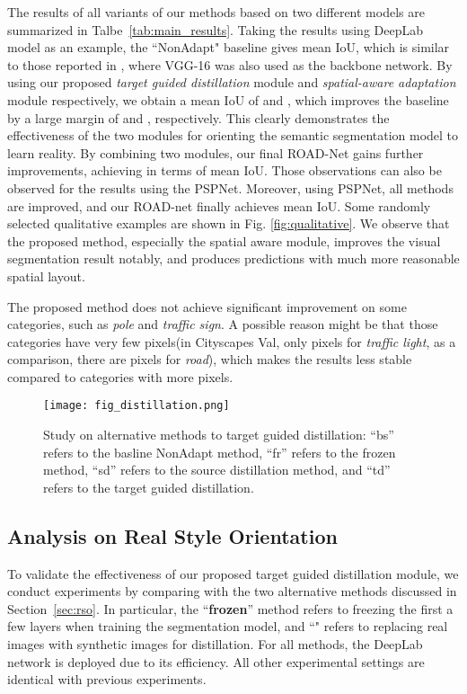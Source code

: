 \documentclass[10pt,twocolumn,letterpaper]{article}
\begin{document}
The results of all variants of our methods based on two different models are summarized in Talbe~\ref{tab:main_results}. Taking the results using DeepLab model as an example, the ``NonAdapt" baseline gives  mean IoU, which is similar to those reported in \cite{hoffman2016fcns,zhang2017curriculum}, where VGG-16 was also used as the backbone network. By using our proposed \textit{target guided distillation} module and \textit{spatial-aware adaptation} module respectively, we obtain a mean IoU of  and , which improves the baseline by a large margin of  and , respectively. This clearly demonstrates the effectiveness of the two modules for orienting the semantic segmentation model to learn reality.  By combining two modules, our final ROAD-Net gains further improvements, achieving  in terms of mean IoU. Those observations can also be observed for the results using the PSPNet. Moreover, using PSPNet, all methods are improved, and our ROAD-net finally achieves  mean IoU. Some randomly selected qualitative examples are shown in Fig. \ref{fig:qualitative}. We observe that the proposed method, especially the spatial aware module, improves the visual segmentation result notably, and produces predictions with much more reasonable spatial layout.

The proposed method does not achieve significant improvement on some categories, such as \textit{pole} and \textit{traffic sign}. A possible reason might be that those categories have very few pixels(\eg in Cityscapes Val, only  pixels for \textit{traffic light}, as a comparison, there are  pixels for \textit{road}), which makes the results less stable compared to categories with more pixels. 

\begin{figure}
\centering
\texttt{[image: fig\_distillation.png]}
\caption{Study on alternative methods to target guided distillation: ``bs'' refers to the basline NonAdapt method, ``fr'' refers to the frozen method, ``sd'' refers to the source distillation method, and ``td'' refers to the target guided distillation.}
\label{fig:frozen}
\end{figure}

\subsection{Analysis on Real Style Orientation}
\label{sec:exp_rso}

To validate the effectiveness of our proposed target guided distillation module, we conduct experiments by comparing with the two alternative methods discussed in Section~\ref{sec:rso}. In particular, the ``\textbf{frozen}'' method refers to freezing the first a few layers when training the segmentation model, and ``" refers to replacing real images with synthetic images for distillation. For all methods, the DeepLab network is deployed due to its efficiency. All other experimental settings are identical with previous experiments. 
\end{document}
